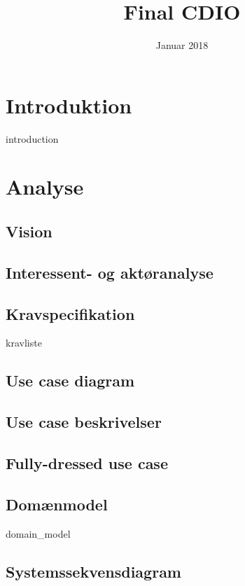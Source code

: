 \documentclass{article}
\title{Final CDIO}
\author{}
\date{Januar 2018}
\begin{document}
{\selectfont
\maketitle
\thispagestyle{empty}
\newpage
\tableofcontents
\thispagestyle{empty}
\newpage
\clearpage
\setcounter{page}{1}

\section{Introduktion}
{introduction}

\section{Analyse}
\subsection{Vision}

\subsection{Interessent- og aktøranalyse}

\subsection{Kravspecifikation}

\cite{spilleregler}
{kravliste}

\subsection{Use case diagram}

\subsection{Use case beskrivelser}


\subsection{Fully-dressed use case}


\subsection{Domænmodel}
{domain_model}

\subsection{Systemssekvensdiagram}

}
\end{document}
